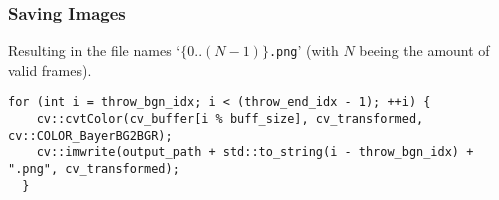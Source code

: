 \subsubsection{Saving Images}
\label{subsubsec:saving_images}

Resulting in the file names `\texttt{$\{0..(N-1)\}$.png}' (with $N$ beeing the amount of valid frames).

\begin{lstlisting}[style=C++]
  for (int i = throw_bgn_idx; i < (throw_end_idx - 1); ++i) {
    cv::cvtColor(cv_buffer[i % buff_size], cv_transformed, cv::COLOR_BayerBG2BGR);
    cv::imwrite(output_path + std::to_string(i - throw_bgn_idx) + ".png", cv_transformed);
  }
\end{lstlisting}
